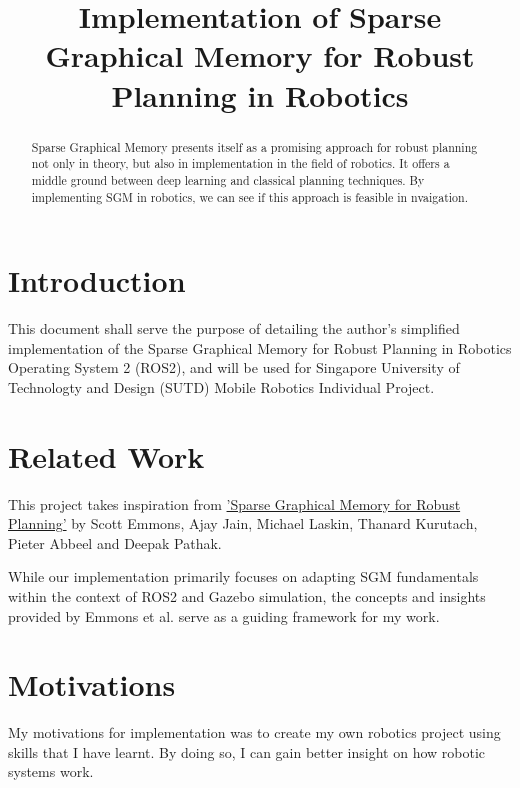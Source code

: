 \documentclass[conference]{IEEEtran}
\begin{document}
\title{Implementation of Sparse Graphical Memory for Robust Planning in Robotics}

\author{
}

\maketitle

\begin{abstract}
  Sparse Graphical Memory presents itself as a promising approach for robust planning not only in theory, but also in implementation in the field of robotics. It offers a middle ground between deep learning and classical planning techniques. By implementing SGM in robotics, we can see if this approach is feasible in nvaigation.\end{abstract}

\section{Introduction}
This document shall serve the purpose of detailing the author's simplified implementation of the Sparse Graphical Memory for Robust Planning in Robotics Operating System 2 (ROS2), and will be used for Singapore University of Technologty and Design (SUTD) Mobile Robotics Individual Project.

\section{Related Work}
This project takes inspiration from \href{https://paperswithcode.com/paper/sparse-graphical-memory-for-robust-planning}{'Sparse Graphical Memory for Robust Planning'} by Scott Emmons, Ajay Jain, Michael Laskin, Thanard Kurutach, Pieter Abbeel and Deepak Pathak.

While our implementation primarily focuses on adapting SGM fundamentals within the context of ROS2 and Gazebo simulation, the concepts and insights provided by Emmons et al. serve as a guiding framework for my work.

\section{Motivations}
My motivations for implementation was to create my own robotics project using skills that I have learnt. By doing so, I can gain better insight on how robotic systems work.
\end{document}
